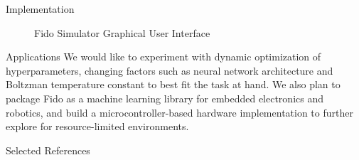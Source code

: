 \documentclass[final]{beamer}
\newlength{\onecolwid}
\begin{document}
\begin{frame}[t]
\begin{columns}[t]
\begin{column}{\onecolwid}
\begin{block}{Implementation}
		\begin{figure}
			\centering
			\caption{Fido Simulator Graphical User Interface}
		\end{figure}
	\end{block}

	\begin{block}{Applications}
		We would like to experiment with dynamic optimization of hyperparameters, changing factors such as neural network architecture and Boltzman temperature constant to best fit the task at hand.  We also plan to package Fido as a machine learning library for embedded electronics and robotics, and build a microcontroller-based hardware implementation to further explore for resource-limited environments.
	\end{block}

	\begin{block}{Selected References}
		\nocite{*}
		{\fontsize{25}{30}\vspace{0.75in}}
	\end{block}

\end{column}

\end{columns}
\end{frame}
\end{document}
